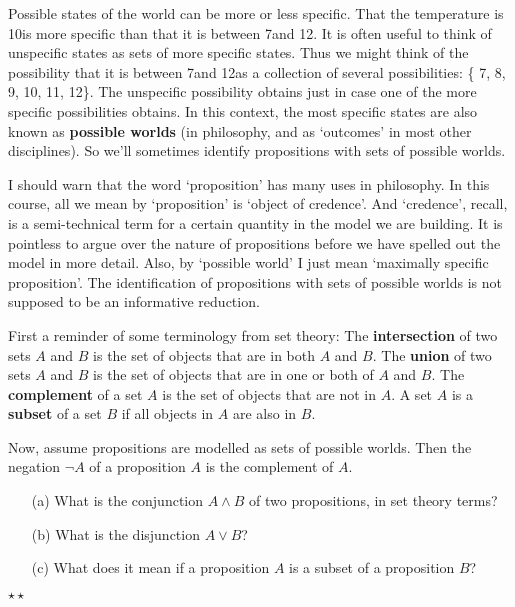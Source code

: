 
Possible states of the world can be more or less specific. That the
temperature is 10\celsius is more specific than that it is between
7\celsius and 12\celsius. It is often useful to think of unspecific
states as sets of more specific states. Thus we might think of the
possibility that it is between 7\celsius and 12\celsius as a
collection of several possibilities: \{ 7\celsius, 8\celsius,
9\celsius, 10\celsius, 11\celsius, 12\celsius \}. The unspecific
possibility obtains just in case one of the more specific
possibilities obtains. In this context, the most specific states are
also known as \textbf{possible worlds} (in philosophy, and as
`outcomes' in most other disciplines). So we'll sometimes identify
propositions with sets of possible worlds.

I should warn that the word `proposition' has many uses in
philosophy. In this course, all we mean by `proposition' is `object of
credence'. And `credence', recall, is a semi-technical term for a
certain quantity in the model we are building. It is pointless to
argue over the nature of propositions before we have spelled out the
model in more detail. Also, by `possible world' I just mean `maximally
specific proposition'. The identification of propositions with sets of
possible worlds is not supposed to be an informative reduction.

\begin{exercise}
  First a reminder of some terminology from set theory: 
  The \textbf{intersection} of two sets $A$ and $B$ is the set of
  objects that are in both $A$ and $B$. The \textbf{union} of two sets
  $A$ and $B$ is the set of objects that are in one or both of $A$ and
  $B$. The \textbf{complement} of a set $A$ is the set of objects that
  are not in $A$. A set $A$ is a \textbf{subset} of a set $B$ if all
  objects in $A$ are also in $B$.

  Now, assume propositions are modelled as sets of possible
  worlds. Then the negation $\neg A$ of a proposition $A$ is the
  complement of $A$.
  \begin{enumerate}
    \itemsep0em
  \item[(a)] What is the conjunction $A \land B$ of two propositions,
    in set theory terms?
  \item[(b)] What is the disjunction $A \lor B$?
  \item[(c)] What does it mean if a proposition $A$ is a subset of
    a proposition $B$?
  \end{enumerate}
  $\star\star$
  \vspace{-0em}
\end{exercise}

